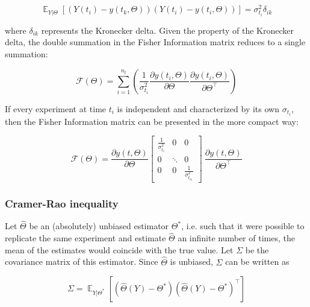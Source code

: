 \documentclass[../Article_Design_of_Experiment.tex]{subfiles}
\begin{document}
	{\footnotesize
	\begin{equation}
		\mathop{\mathbb{E}}_{Y|\Theta} \left[ \left( Y(t_i) - y(t_k, \Theta) \right) \left( Y(t_i) - y(t_i, \Theta) \right) \right] = \sigma_{t_i}^2 \delta_{ik}
	\end{equation} }
	
	where $\delta_{ik}$ represents the Kronecker delta. Given the property of the Kronecker delta, the double summation in the Fisher Information matrix reduces to a single summation:
	
	{\footnotesize
	\begin{equation}
		\mathcal{F}(\Theta) = \sum_{i=1}^{n_t} \left( \frac{1}{\sigma_{t_i}^2} \frac{\partial y(t_i, \Theta)}{\partial \Theta} \frac{\partial y(t_i, \Theta)}{\partial \Theta^\top} \right)
	\end{equation} }
	
	If every experiment at time $t_i$ is independent and characterized by its own $\sigma_{t_i}$, then the Fisher Information matrix can be presented in the more compact way:
	
	{\footnotesize
	\begin{equation}
		\mathcal{F}(\Theta) = \frac{\partial y(t, \Theta)}{\partial \Theta} \begin{bmatrix}
			\frac{1}{\sigma_{t_1}^2} & 0 & 0\\
			0 & \ddots & 0 \\
			0 & 0 & \frac{1}{\sigma_{t_{n_t}}^2} 
		\end{bmatrix}\ \frac{\partial y(t, \Theta)}{\partial \Theta^\top} 
	\end{equation} }
	
	\subsubsection{Cramer-Rao inequality}
	
	Let $\hat{\Theta}$ be an (absolutely) unbiased estimator $\Theta^*$, i.e. such that it were possible to replicate the same experiment and estimate $\hat{\Theta}$ an infinite number of times, the mean of the estimates would coincide with the true value. Let $\Sigma$ be the covariance matrix of this estimator. Since $\hat{\Theta}$ is unbiased, $\Sigma$ can be written as
	
	{\footnotesize
	\begin{equation}
		\Sigma = \mathop{\mathbb{E}}_{Y|\Theta^*} \left[ \left( \hat{\Theta}(Y) - \Theta^* \right) \left( \hat{\Theta}(Y) - \Theta^* \right)^\top \right]
	\end{equation} }
	
\end{document}
